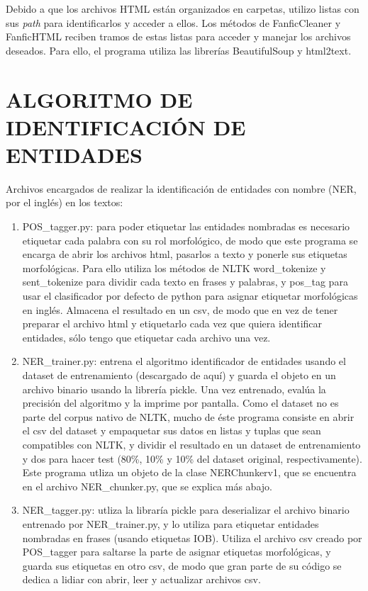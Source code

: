 \documentclass{pre-tfg}
\begin{document}
Debido a que los archivos HTML están organizados en carpetas, utilizo listas con sus \textit{path} para identificarlos y acceder a ellos. Los métodos de FanficCleaner y FanficHTML reciben tramos de estas listas para acceder y manejar los archivos deseados.
Para ello, el programa utiliza las librerías BeautifulSoup y html2text.

\section{ALGORITMO DE IDENTIFICACIÓN DE ENTIDADES}
Archivos encargados de realizar la identificación de entidades con nombre (NER, por el inglés) en los textos:
\begin{enumerate}
	\item POS\_tagger.py: para poder etiquetar las entidades nombradas es necesario etiquetar cada palabra con su rol morfológico, de modo que este programa se encarga de abrir los archivos html, pasarlos a texto y ponerle sus etiquetas morfológicas. Para ello utiliza los métodos de NLTK word\_tokenize y sent\_tokenize para dividir cada texto en frases y palabras, y pos\_tag para usar el clasificador por defecto de python para asignar etiquetar morfológicas en inglés. Almacena el resultado en un csv, de modo que en vez de tener preparar el archivo html y etiquetarlo cada vez que quiera identificar entidades, sólo tengo que etiquetar cada archivo una vez.
	\item NER\_trainer.py: entrena el algoritmo identificador de entidades usando el dataset de entrenamiento (descargado de aquí) y guarda el objeto en un archivo binario usando la librería pickle. Una vez entrenado, evalúa la precisión del algoritmo y la imprime por pantalla. Como el dataset no es parte del corpus nativo de NLTK, mucho de éste programa consiste en abrir el csv del dataset y empaquetar sus datos en listas y tuplas que sean compatibles con NLTK, y dividir el resultado en un dataset de entrenamiento y dos para hacer test (80\%, 10\% y 10\% del dataset original, respectivamente). Este programa utliza un objeto de la clase NERChunkerv1, que se encuentra en el archivo NER\_chunker.py, que se explica más abajo.
	\item NER\_tagger.py: utliza la libraría pickle para deserializar el archivo binario entrenado por NER\_trainer.py, y lo utiliza para etiquetar entidades nombradas en frases (usando etiquetas IOB). Utiliza el archivo csv creado por POS\_tagger para saltarse la parte de asignar etiquetas morfológicas, y guarda sus etiquetas en otro csv, de modo que gran parte de su código se dedica a lidiar con abrir, leer y actualizar archivos csv.
\end{enumerate}
\end{document}
